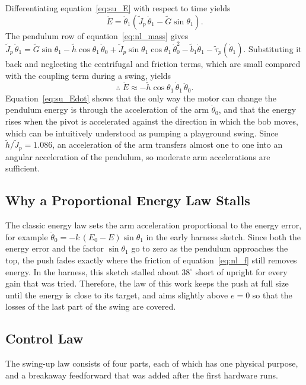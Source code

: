 \documentclass[a4paper,11pt]{article}
\begin{document}
Differentiating equation~\ref{eq:su_E} with respect to time yields
\begin{equation}
  \dot E = \dot\theta_1 \left( \tilde J_p\, \ddot\theta_1 - \tilde G \sin\theta_1 \right).
\end{equation}
The pendulum row of equation~\ref{eq:nl_mass} gives $\tilde J_p\, \ddot\theta_1 = \tilde G \sin\theta_1 - \tilde h \cos\theta_1\, \ddot\theta_0 + \tilde J_p \sin\theta_1 \cos\theta_1\, \dot\theta_0^2 - \tilde b_1 \dot\theta_1 - \tilde\tau_p(\dot\theta_1)$. Substituting it back and neglecting the centrifugal and friction terms, which are small compared with the coupling term during a swing, yields
\begin{equation}
  \therefore\; \dot E \approx -\tilde h \cos\theta_1\, \dot\theta_1\, \ddot\theta_0 .
  \label{eq:su_Edot}
\end{equation}
Equation~\ref{eq:su_Edot} shows that the only way the motor can change the pendulum energy is through the acceleration of the arm $\ddot\theta_0$, and that the energy rises when the pivot is accelerated against the direction in which the bob moves, which can be intuitively understood as pumping a playground swing. Since $\tilde h/\tilde J_p = 1.086$, an acceleration of the arm transfers almost one to one into an angular acceleration of the pendulum, so moderate arm accelerations are sufficient.

\subsection{Why a Proportional Energy Law Stalls}
The classic energy law sets the arm acceleration proportional to the energy error, for example $\ddot\theta_{0} = -k\, (E_0 - E)\sin\theta_1$ in the early harness sketch. Since both the energy error and the factor $\sin\theta_1$ go to zero as the pendulum approaches the top, the push fades exactly where the friction of equation~\ref{eq:nl_f} still removes energy. In the harness, this sketch stalled about $38^\circ$ short of upright for every gain that was tried. Therefore, the law of this work keeps the push at full size until the energy is close to its target, and aims slightly above $e = 0$ so that the losses of the last part of the swing are covered.

\subsection{Control Law}
\label{sec:su_law}
The swing-up law consists of four parts, each of which has one physical purpose, and a breakaway feedforward that was added after the first hardware runs.
\end{document}
